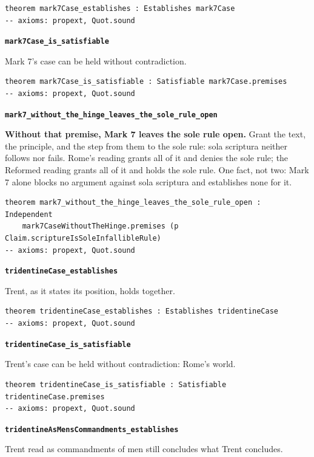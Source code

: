 \documentclass[11pt]{article}
\begin{document}
{\small\begin{verbatim}
theorem mark7Case_establishes : Establishes mark7Case
-- axioms: propext, Quot.sound
\end{verbatim}}
\par\medskip\noindent\textbf{\texttt{mark7\allowbreak{}Case\_\allowbreak{}is\_\allowbreak{}satisfiable}}\par\nobreak\noindent
Mark 7’s case can be held without contradiction.

{\small\begin{verbatim}
theorem mark7Case_is_satisfiable : Satisfiable mark7Case.premises
-- axioms: propext, Quot.sound
\end{verbatim}}
\par\medskip\noindent\textbf{\texttt{mark7\_\allowbreak{}without\_\allowbreak{}the\_\allowbreak{}hinge\_\allowbreak{}leaves\_\allowbreak{}the\_\allowbreak{}sole\_\allowbreak{}rule\_\allowbreak{}open}}\par\nobreak\noindent
\textbf{Without that premise, Mark 7 leaves the sole rule open.} Grant the text, the principle, and the step from them to the sole rule: sola scriptura neither follows nor fails. Rome’s reading grants all of it and denies the sole rule; the Reformed reading grants all of it and holds the sole rule. One fact, not two: Mark 7 alone blocks no argument against sola scriptura and establishes none for it.

{\small\begin{verbatim}
theorem mark7_without_the_hinge_leaves_the_sole_rule_open : Independent
    mark7CaseWithoutTheHinge.premises (p Claim.scriptureIsSoleInfallibleRule)
-- axioms: propext, Quot.sound
\end{verbatim}}
\par\medskip\noindent\textbf{\texttt{tridentine\allowbreak{}Case\_\allowbreak{}establishes}}\par\nobreak\noindent
Trent, as it states its position, holds together.

{\small\begin{verbatim}
theorem tridentineCase_establishes : Establishes tridentineCase
-- axioms: propext, Quot.sound
\end{verbatim}}
\par\medskip\noindent\textbf{\texttt{tridentine\allowbreak{}Case\_\allowbreak{}is\_\allowbreak{}satisfiable}}\par\nobreak\noindent
Trent’s case can be held without contradiction: Rome’s world.

{\small\begin{verbatim}
theorem tridentineCase_is_satisfiable : Satisfiable tridentineCase.premises
-- axioms: propext, Quot.sound
\end{verbatim}}
\par\medskip\noindent\textbf{\texttt{tridentine\allowbreak{}As\allowbreak{}Mens\allowbreak{}Commandments\_\allowbreak{}establishes}}\par\nobreak\noindent
Trent read as commandments of men still concludes what Trent concludes.
\end{document}
